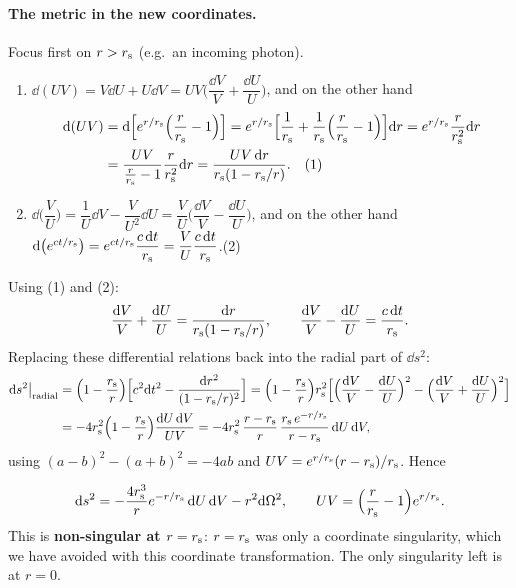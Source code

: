 \paragraph{The metric in the new coordinates.} Focus first on $r>r_{\mathrm s}$ (e.g.\ an incoming photon).
\begin{enumerate}[label=(\roman*)]
\item $\dd(UV)=V\dd U+U\dd V=UV\Big(\dfrac{\dd V}V+\dfrac{\dd U}U\Big)$, and on the other hand
\begin{align*}
  \mathrm{d}(UV)&=\mathrm{d}\Big[e^{r/r_{\mathrm s}}\Big(\frac r{r_{\mathrm s}}-1\Big)\Big]=e^{r/r_{\mathrm s}}\Big[\frac1{r_{\mathrm s}}+\frac1{r_{\mathrm s}}\Big(\frac r{r_{\mathrm s}}-1\Big)\Big]\mathrm{d} r=e^{r/r_{\mathrm s}}\frac{r}{r_{\mathrm s}^2}\mathrm{d} r\\
  &=\frac{UV}{\frac r{r_{\mathrm s}}-1}\frac{r}{r_{\mathrm s}^2}\mathrm{d} r=\frac{UV\,\mathrm{d} r}{r_{\mathrm s}(1-r_{\mathrm s}/r)}.\quad(1)
\end{align*}
\item $\dd\Big(\dfrac VU\Big)=\dfrac1U\dd V-\dfrac V{U^2}\dd U=\dfrac VU\Big(\dfrac{\dd V}V-\dfrac{\dd U}U\Big)$, and on the other hand $\mathrm{d}\big(e^{ct/r_{\mathrm s}}\big)=e^{ct/r_{\mathrm s}}\dfrac{c\,\mathrm{d} t}{r_{\mathrm s}}=\dfrac VU\dfrac{c\,\mathrm{d} t}{r_{\mathrm s}}$.\quad(2)
\end{enumerate}
Using (1) and (2):
\begin{equation}
  \frac{\mathrm{d} V}V+\frac{\mathrm{d} U}U=\frac{\mathrm{d} r}{r_{\mathrm s}(1-r_{\mathrm s}/r)},\qquad\frac{\mathrm{d} V}V-\frac{\mathrm{d} U}U=\frac{c\,\mathrm{d} t}{r_{\mathrm s}}.
\end{equation}
Replacing these differential relations back into the radial part of $\dd s^2$:
\begin{align}
  \mathrm{d} s^2\big|_{\rm radial}&=\Big(1-\frac{r_{\mathrm s}} r\Big)\Big[c^2\mathrm{d} t^2-\frac{\mathrm{d} r^2}{(1-r_{\mathrm s}/r)^2}\Big]
  =\Big(1-\frac{r_{\mathrm s}} r\Big)r_{\mathrm s}^2\Big[\Big(\frac{\mathrm{d} V}V-\frac{\mathrm{d} U}U\Big)^2-\Big(\frac{\mathrm{d} V}V+\frac{\mathrm{d} U}U\Big)^2\Big]\nonumber\\
  &=-4r_{\mathrm s}^2\Big(1-\frac{r_{\mathrm s}} r\Big)\frac{\mathrm{d} U\,\mathrm{d} V}{UV}
  =-4r_{\mathrm s}^2\,\frac{r-r_{\mathrm s}}{r}\,\frac{r_{\mathrm s}\,e^{-r/r_{\mathrm s}}}{r-r_{\mathrm s}}\,\mathrm{d} U\,\mathrm{d} V ,
\end{align}
using $(a-b)^2-(a+b)^2=-4ab$ and $UV=e^{r/r_{\mathrm s}}(r-r_{\mathrm s})/r_{\mathrm s}$. Hence
\begin{keyresult}
\begin{equation}
  \mathrm{d} s^2=-\frac{4r_{\mathrm s}^3}{r}e^{-r/r_{\mathrm s}}\,\mathrm{d} U\,\mathrm{d} V-r^2\mathrm{d}\Omega^2,\qquad UV=\Big(\frac r{r_{\mathrm s}}-1\Big)e^{r/r_{\mathrm s}}.
\end{equation}
This is \textbf{non-singular at $r=r_{\mathrm s}$}: $r=r_{\mathrm s}$ was only a coordinate singularity, which we have avoided with this coordinate transformation. The only singularity left is at $r=0$.
\end{keyresult}

